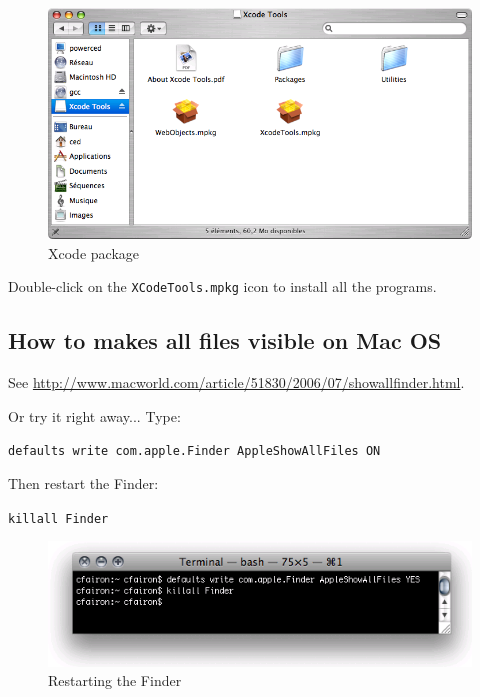\begin{figure}[!h]
\begin{center}
\includegraphics[width=14cm]{resources/img/fig-mac5.png}
\caption{Xcode package\label{fig-mac5}}
\end{center}
\end{figure}


\bigskip
\noindent Double-click on the \verb+XCodeTools.mpkg+ icon to install all the
programs.


\subsection{How to makes all files visible on Mac OS}
\noindent See
\url{http://www.macworld.com/article/51830/2006/07/showallfinder.html}.

\bigskip
\noindent Or try it right away... Type: 

\bigskip
\verb+defaults write com.apple.Finder AppleShowAllFiles ON+

\bigskip
\noindent Then restart the Finder:

\bigskip
\verb+killall Finder+

\begin{figure}[!h]
\begin{center}
\includegraphics[width=12cm]{resources/img/fig-mac6.png}
\caption{Restarting the Finder\label{fig-mac6}}
\end{center}
\end{figure}

